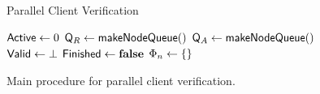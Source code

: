 \begin{figure}[ht]
\begin{minipage}{\textwidth}
\begin{algorithm}[H] %
  \caption{Parallel Client Verification}
\begin{algorithmic}[1]
  \label{fig:paralg:parallelVerifyAlg}
  \State $\mathsf{Active} \gets 0$
    \label{fig:paralg:initWait}
  \State \Atomic $\mathsf{Q}_{R} \gets \mathsf{makeNodeQueue}()$
    \label{fig:paralg:initReady}
  \State \Atomic $\mathsf{Q}_{A} \gets \mathsf{makeNodeQueue}()$
    \label{fig:paralg:initAdded}
  \State \Atomic $\mathsf{Valid} \gets \bot$
    \label{fig:paralg:initValid}
  \State \Atomic $\mathsf{Finished} \gets \textbf{false}$
    \label{fig:paralg:initFinished}
  \State $\Phi_{n} \gets \{\}$
    \label{fig:paralg:initTraining}
  \State \Spawn \Call{\clusterSelector}{\msg{\msgNmbr}, 
                                        \trainingFrags{}, 
                                        \trainingFrags{\msgNmbr}} 
    \label{fig:paralg:spawnClusterSelector}
  \State \Spawn {}
    \label{fig:paralg:spawnNodeScheduler}
    \State \Spawn \Call{\verifyWorker}{\msg{\msgNmbr}, 
                                       \readyQ, \addedQ, 
                                       \activeCount, \verifyFinished, 
                                       \validState}
      \label{fig:paralg:spawnVerifyWorker}
  \EndFor
  \State \Sync
    \label{fig:paralg:sync}
  \State \Return \validState
    \label{fig:paralg:returnValid}
\EndProcedure
\Statex
\end{algorithmic}
\end{algorithm}
\end{minipage}
\caption{Main procedure for parallel client verification.
\label{fig:paralg}}
\end{figure}


